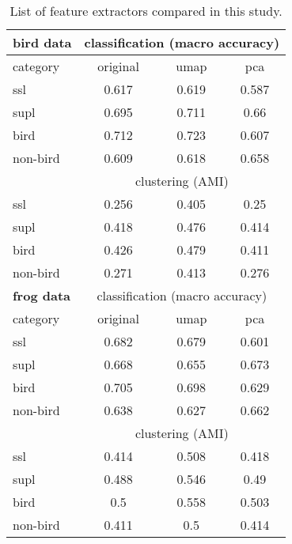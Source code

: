 
\begin{table}[t]
  
  \caption{List of feature extractors compared in this study. }
  \label{tab:results}
  \centering
  \begin{tabular}{|l|ccc|}
    \hline
    \textbf{bird data}& \multicolumn{3}{c|}{classification (macro accuracy)} \\
    \hline
    category &
    original &
    umap &
    pca \\
    \hline
    ssl & 0.617& 0.619& 0.587 \\
    supl & 0.695& 0.711& 0.66 \\
    bird & 0.712& 0.723& 0.607 \\
    non-bird & 0.609& 0.618& 0.658 \\
    \hline
    & \multicolumn{3}{c|}{clustering (AMI)} \\
    \hline
    ssl & 0.256& 0.405& 0.25 \\
    supl & 0.418& 0.476& 0.414 \\
    bird & 0.426& 0.479& 0.411 \\
    non-bird & 0.271& 0.413& 0.276 \\
    \hline
    \textbf{frog data}& \multicolumn{3}{c|}{classification (macro accuracy)} \\
    \hline
    category &
    original &
    umap &
    pca \\
    \hline
    ssl & 0.682& 0.679& 0.601 \\
    supl & 0.668& 0.655& 0.673 \\
    bird & 0.705& 0.698& 0.629 \\
    non-bird & 0.638& 0.627& 0.662 \\
    \hline
    & \multicolumn{3}{c|}{clustering (AMI)} \\
    \hline
    ssl & 0.414& 0.508& 0.418 \\
    supl & 0.488& 0.546& 0.49 \\
    bird & 0.5& 0.558& 0.503 \\
    non-bird & 0.411& 0.5& 0.414 \\
    \hline
  \end{tabular}
\end{table}


    
